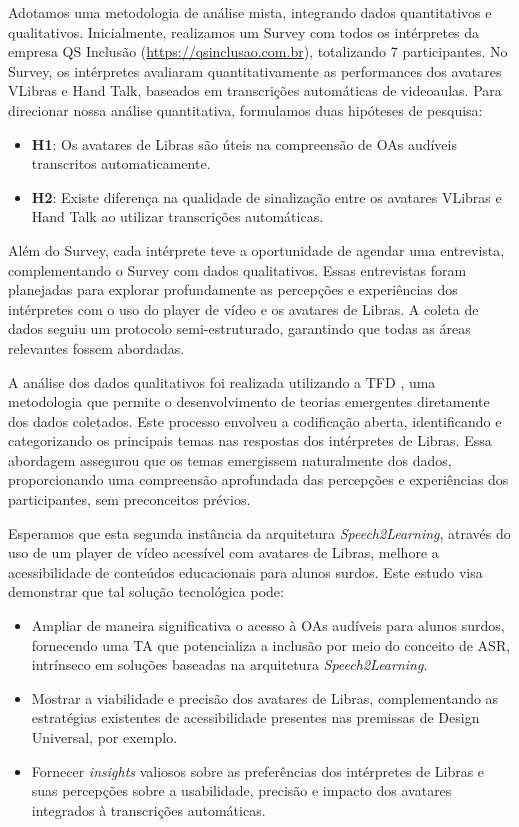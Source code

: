 Adotamos uma metodologia de análise mista, integrando dados quantitativos e qualitativos. Inicialmente, realizamos um Survey com todos os intérpretes da empresa QS Inclusão (\url{https://qsinclusao.com.br}), totalizando 7 participantes. No Survey, os intérpretes avaliaram quantitativamente as performances dos avatares VLibras e Hand Talk, baseados em transcrições automáticas de videoaulas. Para direcionar nossa análise quantitativa, formulamos duas hipóteses de pesquisa:

\begin{itemize}
\item \textbf{H1}: Os avatares de Libras são úteis na compreensão de OAs audíveis transcritos automaticamente.
\item \textbf{H2}: Existe diferença na qualidade de sinalização entre os avatares VLibras e Hand Talk ao utilizar transcrições automáticas.
\end{itemize}

Além do Survey, cada intérprete teve a oportunidade de agendar uma entrevista, complementando o Survey com dados qualitativos. Essas entrevistas foram planejadas para explorar profundamente as percepções e experiências dos intérpretes com o uso do player de vídeo e os avatares de Libras. A coleta de dados seguiu um protocolo semi-estruturado, garantindo que todas as áreas relevantes fossem abordadas.

A análise dos dados qualitativos foi realizada utilizando a TFD \cite{Charmaz2009}, uma metodologia que permite o desenvolvimento de teorias emergentes diretamente dos dados coletados. Este processo envolveu a codificação aberta, identificando e categorizando os principais temas nas respostas dos intérpretes de Libras. Essa abordagem assegurou que os temas emergissem naturalmente dos dados, proporcionando uma compreensão aprofundada das percepções e experiências dos participantes, sem preconceitos prévios.

Esperamos que esta segunda instância da arquitetura \textit{Speech2Learning}, através do uso de um player de vídeo acessível com avatares de Libras, melhore a acessibilidade de conteúdos educacionais para alunos surdos. Este estudo visa demonstrar que tal solução tecnológica pode:

\begin{itemize}
    \item Ampliar de maneira significativa o acesso à OAs audíveis para alunos surdos, fornecendo uma TA que potencializa a inclusão por meio do conceito de ASR, intrínseco em soluções baseadas na arquitetura \textit{Speech2Learning}.
    \item Mostrar a viabilidade e precisão dos avatares de Libras, complementando as estratégias existentes de acessibilidade presentes nas premissas de Design Universal, por exemplo.
    \item Fornecer \textit{insights} valiosos sobre as preferências dos intérpretes de Libras e suas percepções sobre a usabilidade, precisão e impacto dos avatares integrados à transcrições automáticas.
\end{itemize}

